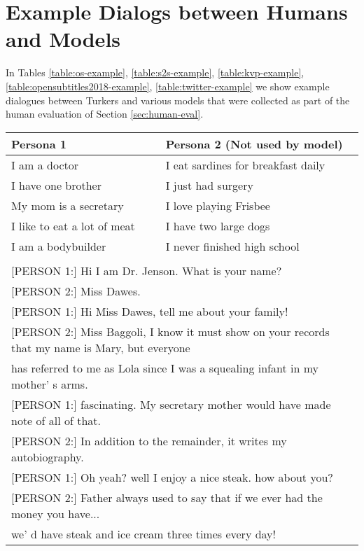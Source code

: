 \section{Example Dialogs between Humans and Models}

In Tables \ref{table:os-example}, \ref{table:s2s-example}, \ref{table:kvp-example}, 
 \ref{table:opensubtitles2018-example}, \ref{table:twitter-example}
we show  example dialogues between Turkers
and various models that were collected as part of the human evaluation of Section \ref{sec:human-eval}.

\begin{table*}[t]
  \begin{center}
    \begin{small}
      \begin{tabular}{l|l}
        \toprule
        \textbf{Persona 1} & \textbf{Persona 2 (Not used by model)}\\
        \midrule
I am a doctor &  I eat sardines for breakfast daily \\
I have one brother & I just had surgery\\
My mom is a secretary & I love playing Frisbee \\
I like to eat a lot of meat & I have two large dogs \\
I am a bodybuilder & I never finished high school \\
\bottomrule
\multicolumn{2}{l}{ }\\
\multicolumn{2}{l}{[PERSON 1:] Hi I am Dr. Jenson. What is your name?}\\
\multicolumn{2}{l}{[PERSON 2:] Miss Dawes.}\\
\multicolumn{2}{l}{[PERSON 1:] Hi Miss Dawes, tell me about your family!}\\
\multicolumn{2}{l}{[PERSON 2:] Miss Baggoli, I know it must show on your records that my name is Mary, but everyone} \\\multicolumn{2}{l}{has referred to me as Lola since I was a squealing infant in my mother' s arms. }\\
\multicolumn{2}{l}{[PERSON 1:] fascinating. My secretary mother would have made note of all of that.}\\
\multicolumn{2}{l}{[PERSON 2:] In addition to the remainder, it writes my autobiography.}\\
\multicolumn{2}{l}{[PERSON 1:] Oh yeah? well I enjoy a nice steak. how about you?}\\
\multicolumn{2}{l}{[PERSON 2:] Father always used to say that if we ever had the money you have...}\\ \multicolumn{2}{l}{we' d have steak and ice cream three times every day!}\\

\end{tabular}
\end{small}
\end{center}
\end{table*}
